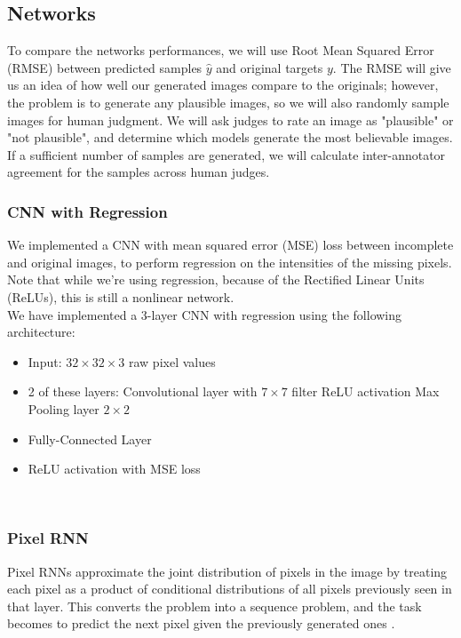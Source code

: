 \documentclass[10pt,twocolumn,letterpaper]{article}
\begin{document}
\subsection{Networks}
To compare the networks performances, we will use Root Mean Squared Error (RMSE) between predicted samples $\hat y$ and original targets $y$. The RMSE will give us an idea of how well our generated images compare to the originals; however, the problem is to generate any plausible images, so we will also randomly sample images for human judgment. We will ask judges to rate an image as "plausible" or "not plausible", and determine which models generate the most believable images. If a sufficient number of samples are generated, we will calculate inter-annotator agreement for the samples across human judges. \\

\subsubsection{CNN with Regression}
\par We implemented a CNN with mean squared error (MSE) loss between incomplete and original images, to perform regression on the intensities of the missing pixels. Note that while we're using regression, because of the Rectified Linear Units (ReLUs), this is still  a nonlinear network. \\

We have implemented a 3-layer CNN with regression using the following architecture: 
\begin{itemize}
\item Input: $32  \times  32  \times  3$ raw pixel values
\item 2 of these layers:
\subitem Convolutional layer with $7  \times  7$ filter
\subitem ReLU activation
\subitem Max Pooling layer $2  \times  2$
\item Fully-Connected Layer
\item ReLU activation with MSE loss
\end{itemize}
\

\subsubsection{Pixel RNN}
Pixel RNNs approximate the joint distribution of pixels in the image by treating each pixel as a product of conditional distributions of all pixels previously seen in that layer.  This converts the problem into a sequence problem, and the task becomes to predict the next pixel given the previously generated ones \cite{pixelRNN}. 
\end{document}
